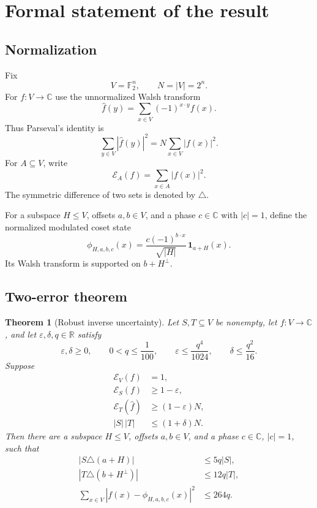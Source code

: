 \documentclass[11pt]{article}
\newtheorem{theorem}{Theorem}[section]
\theoremstyle{remark}
\newcommand{\F}{\mathbb F}
\newcommand{\C}{\mathbb C}
\newcommand{\E}{\mathcal E}
\newcommand{\1}{\mathbf 1}
\begin{document}
\section{Formal statement of the result}

\subsection{Normalization}

Fix
\[
  V=\F_2^n,\qquad N=|V|=2^n.
\]
For $f:V\to\C$ use the unnormalized Walsh transform
\[
  \widehat f(y)=\sum_{x\in V}(-1)^{x\cdot y}f(x).
\]
Thus Parseval's identity is
\[
  \sum_{y\in V}|\widehat f(y)|^2
    =N\sum_{x\in V}|f(x)|^2.
\]
For $A\subseteq V$, write
\[
  \E_A(f)=\sum_{x\in A}|f(x)|^2.
\]
The symmetric difference of two sets is denoted by $\triangle$.

For a subspace $H\leq V$, offsets $a,b\in V$, and a phase $c\in\C$ with
$|c|=1$, define the normalized modulated coset state
\begin{equation}\label{eq:coset-state}
  \phi_{H,a,b,c}(x)
  =\frac{c(-1)^{b\cdot x}}{\sqrt{|H|}}\,\1_{a+H}(x).
\end{equation}
Its Walsh transform is supported on $b+H^\perp$.

\subsection{Two-error theorem}

\begin{theorem}[Robust inverse uncertainty]\label{thm:main}
Let $S,T\subseteq V$ be nonempty, let $f:V\to\C$, and let
$\varepsilon,\delta,q\in\mathbb R$ satisfy
\[
  \varepsilon,\delta\geq0,\qquad
  0<q\leq\frac1{100},\qquad
  \varepsilon\leq\frac{q^4}{1024},\qquad
  \delta\leq\frac{q^2}{16}.
\]
Suppose
\begin{align}
  \E_V(f)&=1,\label{eq:normalization}\\
  \E_S(f)&\geq1-\varepsilon,\label{eq:primal-concentration}\\
  \E_T(\widehat f)&\geq(1-\varepsilon)N,
    \label{eq:dual-concentration}\\
  |S|\,|T|&\leq(1+\delta)N.\label{eq:product}
\end{align}
Then there are a subspace $H\leq V$, offsets $a,b\in V$, and a phase
$c\in\C$, $|c|=1$, such that
\begin{align}
  |S\triangle(a+H)|&\leq5q|S|,\label{eq:S-shape}\\
  |T\triangle(b+H^\perp)|&\leq12q|T|,\label{eq:T-shape}\\
  \sum_{x\in V}|f(x)-\phi_{H,a,b,c}(x)|^2
    &\leq264q.\label{eq:state-shape}
\end{align}
\end{theorem}
\end{document}
